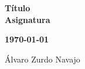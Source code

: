 \begin{center}
\vspace*{3cm} %
{\huge \textbf{Título}}\\
\vspace{0.75cm}
\textbf{Asignatura} \\
\begin{center}
    \large{\textbf{\today}} \\
\end{center}

\vspace{5cm} %

\begin{center}
        Álvaro Zurdo Navajo
\end{center}

\end{center}